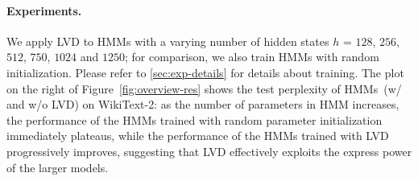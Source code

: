 \documentclass{article} %
\newcommand{\anji}[1]{\textcolor{purple}{\textbf{[Anji: #1]}}}
\begin{document}
\paragraph{Experiments.}
We apply LVD to HMMs with a varying number of hidden states $h$ = $128$, $256$, $512$, $750$, $1024$ and $1250$; for comparison, we also train HMMs with random initialization. Please refer to \cref{sec:exp-details} for details about training. The plot on the right of Figure~\ref{fig:overview-res} shows the test perplexity of HMMs~(w/ and w/o LVD) on WikiText-2: as the number of parameters in HMM increases, the performance of the HMMs trained with random parameter initialization immediately plateaus, while the performance of the HMMs trained with LVD progressively improves, suggesting that LVD effectively exploits the express power of the larger models.



\end{document}
